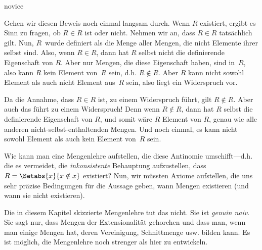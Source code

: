 \documentclass[../../../include/open-logic-section]{subfiles}
\begin{document}
\begin{tagblock}{novice}
\begin{explain}
Gehen wir diesen Beweis noch einmal langsam durch. Wenn $R$ existiert,
ergibt es Sinn zu fragen, ob $R \in
R$ ist oder nicht. Nehmen wir an, dass $R \in R$ tatsächlich gilt.
Nun, $R$~wurde definiert als die Menge aller
Mengen, die nicht Elemente ihrer selbst sind. Also, wenn $R \in R$,
dann hat $R$ selbst nicht die definierende Eigenschaft von $R$. Aber nur Mengen,
die diese Eigenschaft haben, sind in~$R$, also kann $R$ kein Element
von~$R$ sein, d.h. $R \notin R$. Aber $R$ kann nicht sowohl Element als auch nicht
Element aus~$R$ sein, also liegt ein Widerspruch vor.

Da die Annahme, dass $R \in R$ ist, zu einem Widerspruch führt, gilt
$R \notin R$. Aber auch das führt zu einem Widerspruch! Denn wenn $R
\notin R$, dann hat $R$ selbst die definierende Eigenschaft von $R$, und somit wäre $R$
Element von $R$, genau wie alle anderen nicht-selbst-enthaltenden Mengen.
Und noch einmal, es kann nicht sowohl Element als auch kein Element von~$R$ sein.
\end{explain}
\end{tagblock}

\begin{digress}
Wie kann man eine Mengenlehre aufstellen, die diese Antinomie umschifft---d.h. die es vermeidet, die \emph{inkonsistente}
Behauptung aufzustellen, dass $R = \Setabs{x}{x \notin x}$ existiert?
Nun, wir müssten
Axiome aufstellen, die uns sehr präzise Bedingungen für die Aussage geben, wann
Mengen existieren (und wann sie nicht existieren). 
	
Die in diesem Kapitel skizzierte Mengenlehre tut das nicht. Sie ist
\emph{genuin naiv}. Sie sagt nur, dass Mengen der Extensionalität gehorchen
und dass man, wenn man einige Mengen hat, deren
Vereinigung, Schnittmenge usw. bilden kann. Es ist möglich, die Mengenlehre noch
strenger als hier zu entwickeln. 
\end{digress}
\end{document}
